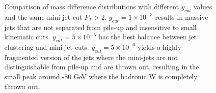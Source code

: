 \begin{figure}
    \centering
    \begin{minipage}{0.49\textwidth}
        \centering
        
        \caption{Comparison of mass difference distributions with different $y_{cut}$ values and the same mini-jet cut $P_T > 2$. $y_{cut} = 1\times 10^{-3}$ results in massive jets that are not separated from pile-up and insensitive to small kinematic cuts. $y_{cut} = 5\times 10^{-5}$ has the best balance between jet clustering and mini-jet cuts. $y_{cut} = 5\times 10^{-6}$ yields a highly fragmented version of the jets where the mini-jets are not distinguishable from pile-up and are thrown out, resulting in the small peak around -80 GeV where the hadronic W is completely thrown out.  }
        \label{fig:supdiff}
    \end{minipage}\hfill
    \begin{minipage}{0.49\textwidth}
        \centering
        

\end{minipage}
\end{figure}
